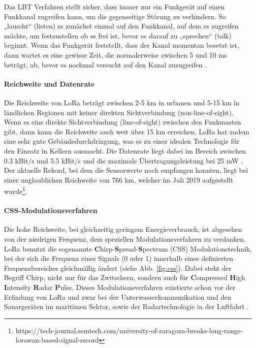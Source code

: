 Das LBT Verfahren stellt sicher, dass immer nur ein Funkgerät auf einen Funkkanal zugreifen kann, um die gegenseitige Störung zu verhindern. So „lauscht“ (listen) es zunächst einmal auf den Funkkanal, auf dem es zugreifen möchte, um festzustellen ob es frei ist, bevor es darauf zu „sprechen“ (talk) beginnt. Wenn das Funkgerät feststellt, dass der Kanal momentan besetzt ist, dann wartet es eine gewisse Zeit, die normalerweise zwischen 5 und 10 ms beträgt, ab, bevor es nochmal versucht auf den Kanal zuzugreifen \cite{Staniec2020}. 

\paragraph{Reichweite und Datenrate}

Die Reichweite von LoRa beträgt zwischen 2-5 km in urbanen und 5-15 km in ländlichen Regionen mit keiner direkten Sichtverbindung (non-line-of-sight). Wenn es eine direkte Sichtverbindung (line-of-sight) zwischen den Funkmasten gibt, dann kann die Reichweite auch weit über 15 km erreichen. LoRa hat zudem eine sehr gute Gebäudedurchdringung, was es zu einer idealen Technologie für den Einsatz in Kellern ausmacht. Die Datenrate liegt dabei im Bereich zwischen 0.3 kBit/s  und 5.5 kBit/s und die maximale Übertragungsleistung bei 25 mW \cite{lora2022}. Der aktuelle Rekord, bei dem die Sensorwerte noch empfangen konnten, liegt bei einer unglaublichen Reichweite von 766 km, welcher im Juli 2019 aufgestellt wurde\footnote{https://tech-journal.semtech.com/university-of-zaragoza-breaks-long-range-lorawan-based-signal-record}.

\paragraph{CSS-Modulationsverfahren}

Die hohe Reichweite, bei gleichzeitig geringem Energieverbrauch, ist abgesehen von der niedrigen Frequenz, dem speziellen Modulationsverfahren zu verdanken. LoRa benutzt die sogenannte \textbf{C}hirp-\textbf{S}pread-\textbf{S}pectrum (CSS) Modulationstechnik, bei der sich die Frequenz eines Signals (0 oder 1) innerhalb eines definierten Frequenzbereiches gleichmäßig ändert (siehe Abb. \ref{fig:css}). Dabei steht der Begriff Chirp, nicht nur für das Zwitschern, sondern auch für \textbf{C}ompressed \textbf{H}igh \textbf{I}ntensity \textbf{R}adar \textbf{P}ulse. Dieses Modulationsverfahren existierte schon vor der Erfindung von LoRa und zwar bei der Unterwasserkommunikation und den Sonargeräten im maritimen Sektor, sowie der Radartechnologie in der Luftfahrt \cite{semtech2020}. 

